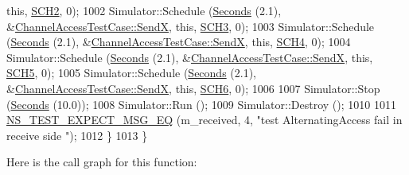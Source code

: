 \begin{DoxyCode}
{      this}, \hyperlink{channel-manager_8h_a07a0bff852fe2b8538a46d6e779546b6}{SCH2}, 0);
1002     Simulator::Schedule (\hyperlink{group__timecivil_ga33c34b816f8ff6628e33d5c8e9713b9e}{Seconds} (2.1), &\hyperlink{classChannelAccessTestCase_a372d321c372c644c86ff355e94704eaf}{ChannelAccessTestCase::SendX}, \textcolor{keyword}{
      this}, \hyperlink{channel-manager_8h_ad3135bbb37bccc4d3d6a2bf4545cf7a5}{SCH3}, 0);
1003     Simulator::Schedule (\hyperlink{group__timecivil_ga33c34b816f8ff6628e33d5c8e9713b9e}{Seconds} (2.1), &\hyperlink{classChannelAccessTestCase_a372d321c372c644c86ff355e94704eaf}{ChannelAccessTestCase::SendX}, \textcolor{keyword}{
      this}, \hyperlink{channel-manager_8h_ab57f1414f1847a896d2b7f5f49c916ea}{SCH4}, 0);
1004     Simulator::Schedule (\hyperlink{group__timecivil_ga33c34b816f8ff6628e33d5c8e9713b9e}{Seconds} (2.1), &\hyperlink{classChannelAccessTestCase_a372d321c372c644c86ff355e94704eaf}{ChannelAccessTestCase::SendX}, \textcolor{keyword}{
      this}, \hyperlink{channel-manager_8h_a130c7e5b0b345ef89bdcfa3dc201c4e6}{SCH5}, 0);
1005     Simulator::Schedule (\hyperlink{group__timecivil_ga33c34b816f8ff6628e33d5c8e9713b9e}{Seconds} (2.1), &\hyperlink{classChannelAccessTestCase_a372d321c372c644c86ff355e94704eaf}{ChannelAccessTestCase::SendX}, \textcolor{keyword}{
      this}, \hyperlink{channel-manager_8h_aaa6c2f65c1bf2134a15028491ac3e5ca}{SCH6}, 0);
1006 
1007     Simulator::Stop (\hyperlink{group__timecivil_ga33c34b816f8ff6628e33d5c8e9713b9e}{Seconds} (10.0));
1008     Simulator::Run ();
1009     Simulator::Destroy ();
1010 
1011     \hyperlink{group__testing_ga7304ba46a28d8cf08dfdfd6499cf7068}{NS\_TEST\_EXPECT\_MSG\_EQ} (m\_received, 4, \textcolor{stringliteral}{"test AlternatingAccess fail in receive side
      "});
1012   \}
1013 \}
\end{DoxyCode}


Here is the call graph for this function\+:



